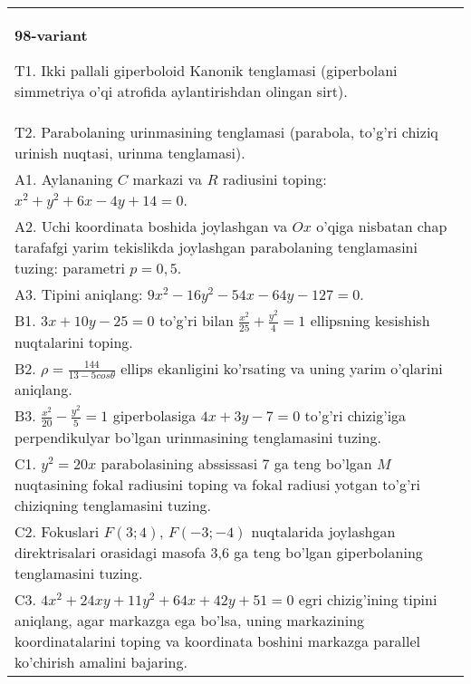 \documentclass{article}
\begin{document}
\begin{tabular}{m{17cm}}
\textbf{98-variant}
\newline

T1. Ikki pallali giperboloid Kanonik tenglamasi (giperbolani simmetriya o'qi atrofida aylantirishdan olingan sirt).\\

T2. Parabolaning urinmasining tenglamasi (parabola, to'g'ri chiziq urinish nuqtasi, urinma tenglamasi).\\

A1. Aylananing $C$ markazi va $R$ radiusini toping: $x^2+y^2+6x-4y+14=0$.\\

A2. Uchi koordinata boshida joylashgan va $Ox$ o'qiga nisbatan chap tarafafgi yarim tekislikda joylashgan parabolaning tenglamasini tuzing: parametri $p=0,5$.\\

A3. Tipini aniqlang: $9x^{2}-16y^{2}-54x-64y-127=0$.\\

B1. $3x + 10y - 25 = 0$ to'g'ri bilan $\frac{x^{2}}{25} + \frac{y^{2}}{4} = 1$ ellipsning kesishish nuqtalarini toping.  \\

B2. $\rho = \frac{144}{13 - 5cos\theta}$ ellips ekanligini ko'rsating va uning yarim o'qlarini aniqlang.\\

B3. $\frac{x^{2}}{20} - \frac{y^{2}}{5} = 1$ giperbolasiga $4x + 3y - 7 = 0$ to'g'ri chizig'iga perpendikulyar bo'lgan urinmasining tenglamasini tuzing.  \\

C1. $y^{2} = 20x$ parabolasining abssissasi 7 ga teng bo'lgan $M$ nuqtasining fokal radiusini toping va fokal radiusi yotgan to'g'ri chiziqning tenglamasini tuzing.  \\

C2. Fokuslari $F(3;4)$, $F(-3;-4)$ nuqtalarida joylashgan direktrisalari orasidagi masofa 3,6 ga teng bo'lgan giperbolaning tenglamasini tuzing.  \\

C3. $4x^{2} + 24xy + 11y^{2} + 64x + 42y + 51 = 0$ egri chizig'ining tipini aniqlang, agar markazga ega bo'lsa, uning markazining koordinatalarini toping va koordinata boshini markazga parallel ko'chirish amalini bajaring.\\

\end{tabular}
\vspace{1cm}
\end{document}
